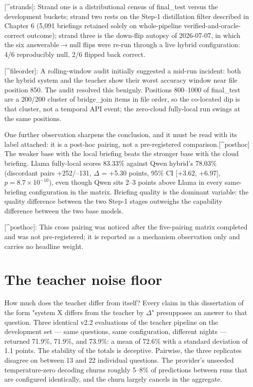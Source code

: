 [\^{}strands]: Strand one is a distributional census of final\_test versus the development buckets; strand two rests on the Step-1 distillation filter described in Chapter 6 (5,091 briefings retained solely on whole-pipeline verified-and-oracle-correct outcome); strand three is the down-flip autopsy of 2026-07-07, in which the six answerable$\rightarrow$null flips were re-run through a live hybrid configuration: 4/6 reproducibly null, 2/6 flipped back correct.

[\^{}fileorder]: A rolling-window audit initially suggested a mid-run incident: both the hybrid system and the teacher show their worst accuracy window near file position 850. The audit resolved this benignly. Positions 800--1000 of final\_test are a 200/200 cluster of bridge\_join items in file order, so the co-located dip is that cluster, not a temporal API event; the zero-cloud fully-local run swings at the same positions.

One further observation sharpens the conclusion, and it must be read with its label attached: it is a post-hoc pairing, not a pre-registered comparison.[\^{}posthoc] The weaker base with the local briefing beats the stronger base with the cloud briefing. Llama fully-local scores 83.33\% against Qwen hybrid's 78.03\% (discordant pairs +252/--131, $\Delta$ = +5.30 points, 95\% CI [+3.62, +6.97], $p=8.7\times10^{-10}$), even though Qwen sits 2--3 points above Llama in every same-briefing configuration in the matrix. Briefing quality is the dominant variable: the quality difference between the two Step-1 stages outweighs the capability difference between the two base models.

[\^{}posthoc]: This cross pairing was noticed after the five-pairing matrix completed and was not pre-registered; it is reported as a mechanism observation only and carries no headline weight.

\section{The teacher noise floor}\label{sec:the-teacher-noise-floor}

How much does the teacher differ from itself? Every claim in this dissertation of the form "system X differs from the teacher by $\Delta$" presupposes an answer to that question. Three identical v2.2 evaluations of the teacher pipeline on the development set --- same questions, same configuration, different nights --- returned 71.9\%, 71.9\%, and 73.9\%: a mean of 72.6\% with a standard deviation of 1.1 points. The stability of the totals is deceptive. Pairwise, the three replicates disagree on between 13 and 22 individual questions. The provider's unseeded temperature-zero decoding churns roughly 5--8\% of predictions between runs that are configured identically, and the churn largely cancels in the aggregate.

